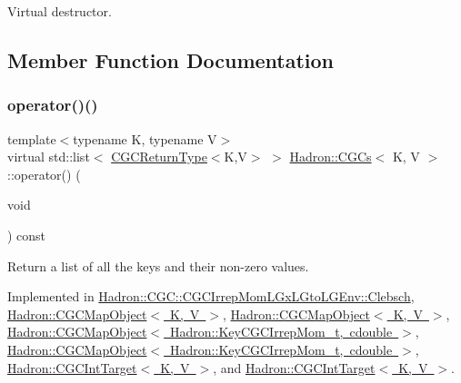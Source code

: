 Virtual destructor. 



\subsection{Member Function Documentation}
\mbox{\label{classHadron_1_1CGCs_ac709374b31c0319e82028b9d7c23e993}} 
\subsubsection{\texorpdfstring{operator()()}{operator()()}\hspace{0.1cm}{\footnotesize\ttfamily [1/4]}}
{\footnotesize\ttfamily template$<$typename K, typename V$>$ \\
virtual std\+::list$<$ \mbox{\hyperlink{structHadron_1_1CGCReturnType}{C\+G\+C\+Return\+Type}}$<$K,V$>$ $>$ \mbox{\hyperlink{classHadron_1_1CGCs}{Hadron\+::\+C\+G\+Cs}}$<$ K, V $>$\+::operator() (\begin{DoxyParamCaption}\item[{void}]{ }\end{DoxyParamCaption}) const\hspace{0.3cm}{\ttfamily [pure virtual]}}



Return a list of all the keys and their non-\/zero values. 



Implemented in \mbox{\hyperlink{classHadron_1_1CGC_1_1CGCIrrepMomLGxLGtoLGEnv_1_1Clebsch_a27a81332c929b1f421704680e794b796}{Hadron\+::\+C\+G\+C\+::\+C\+G\+C\+Irrep\+Mom\+L\+Gx\+L\+Gto\+L\+G\+Env\+::\+Clebsch}}, \mbox{\hyperlink{classHadron_1_1CGCMapObject_aaa4b18e1a2845e16154cd434462c0779}{Hadron\+::\+C\+G\+C\+Map\+Object$<$ K, V $>$}}, \mbox{\hyperlink{classHadron_1_1CGCMapObject_aaa4b18e1a2845e16154cd434462c0779}{Hadron\+::\+C\+G\+C\+Map\+Object$<$ K, V $>$}}, \mbox{\hyperlink{classHadron_1_1CGCMapObject_aaa4b18e1a2845e16154cd434462c0779}{Hadron\+::\+C\+G\+C\+Map\+Object$<$ Hadron\+::\+Key\+C\+G\+C\+Irrep\+Mom\+\_\+t, cdouble $>$}}, \mbox{\hyperlink{classHadron_1_1CGCMapObject_aaa4b18e1a2845e16154cd434462c0779}{Hadron\+::\+C\+G\+C\+Map\+Object$<$ Hadron\+::\+Key\+C\+G\+C\+Irrep\+Mom\+\_\+t, cdouble $>$}}, \mbox{\hyperlink{classHadron_1_1CGCIntTarget_ae6c0ce90fe1f8a2880984df1e2e44c18}{Hadron\+::\+C\+G\+C\+Int\+Target$<$ K, V $>$}}, and \mbox{\hyperlink{classHadron_1_1CGCIntTarget_ae6c0ce90fe1f8a2880984df1e2e44c18}{Hadron\+::\+C\+G\+C\+Int\+Target$<$ K, V $>$}}.

